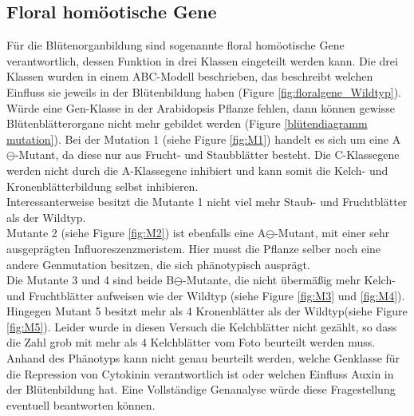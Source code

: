 \documentclass[10pt,a4paper]{article}
\begin{document}
	\subsection{Floral homöotische Gene}
	Für die Blütenorganbildung sind sogenannte floral homöotische Gene verantwortlich, dessen Funktion in drei Klassen eingeteilt werden kann. Die drei Klassen wurden in einem ABC-Modell beschrieben, das beschreibt welchen Einfluss sie jeweils in der Blütenbildung haben (Figure \ref{fig:floralgene_Wildtyp}).\\ 
	Würde eine Gen-Klasse in der Arabidopsis Pflanze fehlen, dann können gewisse Blütenblätterorgane nicht mehr gebildet werden (Figure \ref{blütendiagramm mutation}).
	Bei der Mutation 1 (siehe Figure \ref{fig:M1}) handelt es sich um eine A$\ominus$-Mutant, da diese nur aus Frucht- und Staubblätter besteht. Die C-Klassegene werden nicht durch die A-Klassegene inhibiert und kann somit die Kelch- und Kronenblätterbildung selbst inhibieren.\\
	Interessanterweise besitzt die Mutante 1 nicht viel mehr Staub- und Fruchtblätter als der Wildtyp.\\
	Mutante 2 (siehe Figure \ref{fig:M2}) ist ebenfalls eine A$\ominus$-Mutant, mit einer sehr ausgeprägten Influoreszenzmeristem. Hier musst die Pflanze selber noch eine andere Genmutation besitzen, die sich phänotypisch ausprägt.\\
	Die Mutante 3 und 4 sind beide B$\ominus$-Mutante, die nicht übermäßig mehr Kelch- und Fruchtblätter aufweisen wie der Wildtyp (siehe Figure \ref{fig:M3} und \ref{fig:M4}).
	Hingegen Mutant 5 besitzt mehr als 4 Kronenblätter als der Wildtyp(siehe Figure \ref{fig:M5}). Leider wurde in diesen Versuch die Kelchblätter nicht gezählt, so dass die Zahl grob mit mehr als 4 Kelchblätter vom Foto beurteilt werden muss.\\
	Anhand des Phänotyps kann nicht genau beurteilt werden, welche Genklasse für die Repression von Cytokinin verantwortlich ist oder welchen Einfluss Auxin in der Blütenbildung hat.
	Eine Vollständige Genanalyse würde diese Fragestellung eventuell beantworten können.
	
\end{document}
